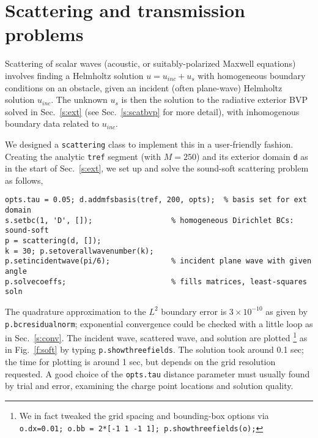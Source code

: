 \bfi %
\efi



\section{Scattering and transmission problems}
\label{s:scatt}

Scattering of scalar waves (acoustic, or suitably-polarized Maxwell
equations) involves finding a Helmholtz solution $u = u_{inc} + u_s$
with homogeneous boundary conditions
on an obstacle, given an incident (often plane-wave)
Helmholtz solution $u_{inc}$.
The unknown $u_s$ is then the solution to the radiative
exterior BVP solved in Sec.~\ref{s:ext}
(see Sec.~\ref{s:scatbvp} for more detail), with inhomogenous boundary data
related to $u_{inc}$.

We designed a {\tt scattering} class to 
implement this in a user-friendly fashion. Creating the analytic
{\tt tref} segment (with $M=250$)
and its exterior domain {\tt d} as in the start of
Sec.~\ref{s:ext}, we set up and solve the sound-soft scattering
problem as follows,
\begin{verbatim}
opts.tau = 0.05; d.addmfsbasis(tref, 200, opts);  % basis set for ext domain
s.setbc(1, 'D', []);                  % homogeneous Dirichlet BCs: sound-soft
p = scattering(d, []);
k = 30; p.setoverallwavenumber(k);
p.setincidentwave(pi/6);              % incident plane wave with given angle
p.solvecoeffs;                        % fills matrices, least-squares soln
\end{verbatim}
The quadrature approximation to the $L^2$ boundary error is $3\times10^{-10}$
as given by {\tt p.bcresidualnorm}; exponential convergence could be checked
with a little loop as in Sec.~\ref{s:conv}. 
The incident wave, scattered wave, and solution are plotted%
  \footnote{We in fact tweaked the grid spacing and bounding-box options via
{\tt o.dx=0.01; o.bb = 2*[-1 1 -1 1]; p.showthreefields(o);}}
as in Fig.~\ref{f:soft} by typing {\tt p.showthreefields}.
The solution took around 0.1 sec; the time for plotting is around 1 sec, but
depends on the grid resolution requested.
A good choice of the {\tt opts.tau} distance parameter must usually found
by trial and error, examining the charge point locations and solution quality.

